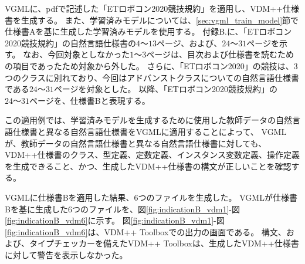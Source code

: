 VGMLに、pdfで記述した「ETロボコン2020競技規約」\cite{ET_robo}を適用し、VDM++仕様書を生成する。
また、学習済みモデルについては、\ref{sec:vgml_train_model}節で仕様書Aを基に生成した学習済みモデルを使用する。
付録B.に、「ETロボコン2020競技規約」の自然言語仕様書の$4～13$ページ、および、$24～31$ページを示す。
なお、今回対象としなかった$1～3$ページは、目次および仕様書を読むための項目であったため対象から外した。
さらに、「ETロボコン2020」の競技は、3つのクラスに別れており、今回はアドバンストクラスについての自然言語仕様書である$24～31$ページを対象とした。
以降、「ETロボコン2020競技規約」の$24～31$ページを、仕様書Bと表現する。

この適用例では、学習済みモデルを生成するために使用した教師データの自然言語仕様書と異なる自然言語仕様書をVGMLに適用することによって、
VGMLが、教師データの自然言語仕様書と異なる自然言語仕様書に対しても、
VDM++仕様書のクラス、型定義、定数定義、インスタンス変数定義、操作定義を生成できること、かつ、生成したVDM++仕様書の構文が正しいことを確認する。

VGMLに仕様書Bを適用した結果、6つのファイルを生成した。
VGMLが仕様書Bを基に生成した6つのファイルを、図\ref{fig:indicationB_vdm1}-図\ref{fig:indicationB_vdm6}に示す。
図\ref{fig:indicationB_vdm1}-図\ref{fig:indicationB_vdm6}は、VDM++ Toolbox\cite{Tools}での出力の画面である。
構文、および、タイプチェッカーを備えたVDM++ Toolboxは、生成したVDM++仕様書に対して警告を表示しなかった。

